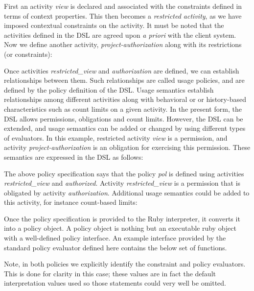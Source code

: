 First an activity {\em view} is declared and associated with the constraints defined in terms of context properties.  This then becomes a {\em restricted activity}, as we have imposed contextual constraints on the activity.  It must be noted that the activities defined in the DSL are agreed upon {\em a priori} with the client system.  Now we define another activity, {\em project-authorization} along with its restrictions (or constraints):



Once activities {\em restricted\_view} and {\em authorization} are defined, we can establish relationships between them. Such relationships are called usage policies, and are defined by the policy definition of the DSL. Usage semantics establish relationships among different activities along with behavioral or or history-based characteristics such as count limits on a given activity. In the present form, the DSL allows permissions, obligations and count limits. However, the DSL can be extended, and usage semantics can be added or changed by using different types of evaluators. In this example, restricted activity {\em view} is a permission, and activity {\em project-authorization} is an obligation for exercising this permission. These semantics are expressed in the DSL as follows: 



The above policy specification says that the policy {\em pol} is defined using activities {\em restricted\_view} and {\em authorized}.  Activity {\em restricted\_view} is a permission that is obligated by activity {\em authorization}.  Additional usage semantics could be added to this activity, for instance count-based limits:



Once the policy specification is provided to the Ruby interpreter, it converts it into a policy object. A policy object is nothing but an executable ruby object with a well-defined policy interface. An example interface provided by the standard policy evaluator defined here contains the below set of functions.

Note, in both policies we explicitly identify the constraint and policy evaluators.  This is done for clarity in this case; these values are in fact the default interpretation values used so those statements could very well be omitted.

